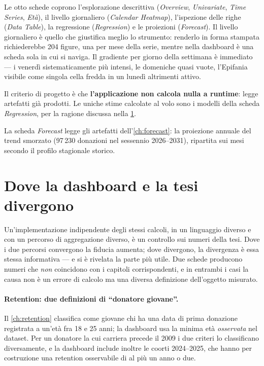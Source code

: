 Le otto schede coprono l'esplorazione descrittiva (\emph{Overview},
\emph{Univariate}, \emph{Time Series}, \emph{Età}), il livello giornaliero
(\emph{Calendar Heatmap}), l'ispezione delle righe (\emph{Data Table}), la
regressione (\emph{Regression}) e le proiezioni (\emph{Forecast}). Il livello
giornaliero è quello che giustifica meglio lo strumento: renderlo in forma
stampata richiederebbe 204 figure, una per mese della serie, mentre nella
dashboard è una scheda sola in cui si naviga. Il gradiente per giorno della
settimana è immediato --- i venerdì sistematicamente più intensi, le domeniche
quasi vuote, l'Epifania visibile come singola cella fredda in un lunedì
altrimenti attivo.

Il criterio di progetto è che \textbf{l'applicazione non calcola nulla a
runtime}: legge artefatti già prodotti. Le uniche stime calcolate al volo sono
i modelli della scheda \emph{Regression}, per la ragione discussa nella
\cref{sec:dash_diverge}.

La scheda \emph{Forecast} legge gli artefatti dell'\cref{ch:forecast}: la
proiezione annuale del trend smorzato (97\,230 donazioni nel sessennio
2026--2031), ripartita sui mesi secondo il profilo stagionale storico.

\section{Dove la dashboard e la tesi divergono}
\label{sec:dash_diverge}

Un'implementazione indipendente degli stessi calcoli, in un linguaggio diverso
e con un percorso di aggregazione diverso, è un controllo sui numeri della
tesi. Dove i due percorsi convergono la fiducia aumenta; dove divergono, la
divergenza è essa stessa informativa --- e si è rivelata la parte più utile.
Due schede producono numeri che \emph{non} coincidono con i capitoli
corrispondenti, e in entrambi i casi la causa non è un errore di calcolo ma una
diversa definizione dell'oggetto misurato.

\paragraph{Retention: due definizioni di ``donatore giovane''.}
Il \cref{ch:retention} classifica come giovane chi ha una data di prima
donazione registrata a un'età fra 18 e 25 anni; la dashboard usa la minima età
\emph{osservata} nel dataset. Per un donatore la cui carriera precede il 2009 i
due criteri lo classificano diversamente, e la dashboard include inoltre le
coorti 2024--2025, che hanno per costruzione una retention osservabile di al
più un anno o due.

